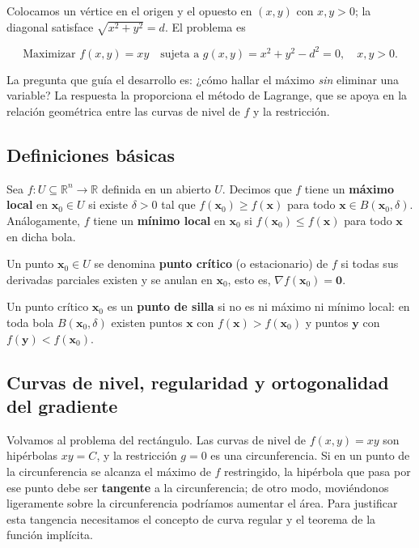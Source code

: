 Colocamos un vértice en el origen y el opuesto en $(x,y)$ con $x,y>0$; la diagonal satisface $\sqrt{x^2+y^2}=d$. El problema es

\[
\text{Maximizar } f(x,y)=xy \quad \text{sujeta a } g(x,y)=x^2+y^2-d^2=0,\quad x,y>0.
\]

La pregunta que guía el desarrollo es: ¿cómo hallar el máximo \emph{sin} eliminar una variable? La respuesta la proporciona el método de Lagrange, que se apoya en la relación geométrica entre las curvas de nivel de $f$ y la restricción.

\subsection{Definiciones básicas}

\begin{definition}
Sea $f\colon U\subseteq \mathbb{R}^n\to\mathbb{R}$ definida en un abierto $U$. Decimos que $f$ tiene un \textbf{máximo local} en $\mathbf{x}_0\in U$ si existe $\delta>0$ tal que $f(\mathbf{x}_0)\ge f(\mathbf{x})$ para todo $\mathbf{x}\in B(\mathbf{x}_0,\delta)$. Análogamente, $f$ tiene un \textbf{mínimo local} en $\mathbf{x}_0$ si $f(\mathbf{x}_0)\le f(\mathbf{x})$ para todo $\mathbf{x}$ en dicha bola.
\end{definition}

\begin{definition}
Un punto $\mathbf{x}_0\in U$ se denomina \textbf{punto crítico} (o estacionario) de $f$ si todas sus derivadas parciales existen y se anulan en $\mathbf{x}_0$, esto es, $\nabla f(\mathbf{x}_0)=\mathbf{0}$.
\end{definition}

\begin{definition}
Un punto crítico $\mathbf{x}_0$ es un \textbf{punto de silla} si no es ni máximo ni mínimo local: en toda bola $B(\mathbf{x}_0,\delta)$ existen puntos $\mathbf{x}$ con $f(\mathbf{x})>f(\mathbf{x}_0)$ y puntos $\mathbf{y}$ con $f(\mathbf{y})<f(\mathbf{x}_0)$.
\end{definition}

\subsection{Curvas de nivel, regularidad y ortogonalidad del gradiente}

Volvamos al problema del rectángulo. Las curvas de nivel de $f(x,y)=xy$ son hipérbolas $xy=C$, y la restricción $g=0$ es una circunferencia. Si en un punto de la circunferencia se alcanza el máximo de $f$ restringido, la hipérbola que pasa por ese punto debe ser \textbf{tangente} a la circunferencia; de otro modo, moviéndonos ligeramente sobre la circunferencia podríamos aumentar el área. Para justificar esta tangencia necesitamos el concepto de curva regular y el teorema de la función implícita.

